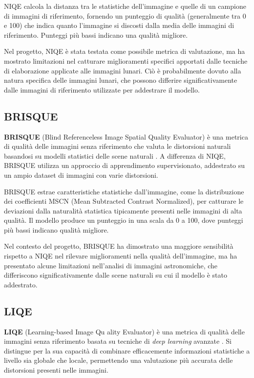 NIQE calcola la distanza tra le statistiche dell'immagine e quelle di un campione di immagini di riferimento, fornendo un punteggio di qualità (generalmente tra 0 e 100) che indica quanto l'immagine si discosti dalla media delle immagini di riferimento. Punteggi più bassi indicano una qualità migliore.

Nel progetto, NIQE è stata testata come possibile metrica di valutazione, ma ha mostrato limitazioni nel catturare miglioramenti specifici apportati dalle tecniche di elaborazione applicate alle immagini lunari. Ciò è probabilmente dovuto alla natura specifica delle immagini lunari, che possono differire significativamente dalle immagini di riferimento utilizzate per addestrare il modello.

\subsection{BRISQUE} \label{subsec:brisque}

\textbf{BRISQUE} (Blind Referenceless Image Spatial Quality Evaluator) è una metrica di qualità delle immagini senza riferimento che valuta le distorsioni naturali basandosi su modelli statistici delle scene naturali \cite{brisque}. A differenza di NIQE, BRISQUE utilizza un approccio di apprendimento supervisionato, addestrato su un ampio dataset di immagini con varie distorsioni.

BRISQUE estrae caratteristiche statistiche dall'immagine, come la distribuzione dei coefficienti MSCN (Mean Subtracted Contrast Normalized), per catturare le deviazioni dalla naturalità statistica tipicamente presenti nelle immagini di alta qualità. Il modello produce un punteggio in una scala da 0 a 100, dove punteggi più bassi indicano qualità migliore.

Nel contesto del progetto, BRISQUE ha dimostrato una maggiore sensibilità rispetto a NIQE nel rilevare miglioramenti nella qualità dell'immagine, ma ha presentato alcune limitazioni nell'analisi di immagini astronomiche, che differiscono significativamente dalle scene naturali su cui il modello è stato addestrato.

\subsection{LIQE} \label{subsec:liqe}

\textbf{LIQE} (Learning-based Image Qu  ality Evaluator) è una metrica di qualità delle immagini senza riferimento basata su tecniche di \textit{deep learning} avanzate \cite{liqe}. Si distingue per la sua capacità di combinare efficacemente informazioni statistiche a livello sia globale che locale, permettendo una valutazione più accurata delle distorsioni presenti nelle immagini.

